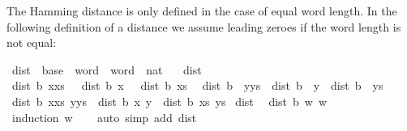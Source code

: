 \begin{isabellebody}
\begin{isamarkuptext}%
The Hamming distance is only defined in the case of equal word length.
In the following definition of a distance we assume leading zeroes
  if the word length is not equal:%
\end{isamarkuptext}\isamarkuptrue%
\isamarkupfalse%
\ dist\ {\isacharcolon}{\kern0pt}{\isacharcolon}{\kern0pt}\ {\isachardoublequoteopen}base\ {\isasymRightarrow}\ word\ {\isasymRightarrow}\ word\ {\isasymRightarrow}\ nat{\isachardoublequoteclose}\ \isanewline
\ \ {\isachardoublequoteopen}dist\ {\isacharunderscore}{\kern0pt}\ {\isacharbrackleft}{\kern0pt}{\isacharbrackright}{\kern0pt}\ {\isacharbrackleft}{\kern0pt}{\isacharbrackright}{\kern0pt}\ {\isacharequal}{\kern0pt}\ {}{\isachardoublequoteclose}\isanewline
{\isacharbar}{\kern0pt}\ {\isachardoublequoteopen}dist\ b\ {\isacharparenleft}{\kern0pt}x{\isacharhash}{\kern0pt}xs{\isacharparenright}{\kern0pt}\ {\isacharbrackleft}{\kern0pt}{\isacharbrackright}{\kern0pt}\ {\isacharequal}{\kern0pt}\ dist{}\ b\ x\ {}\ {\isacharplus}{\kern0pt}\ dist\ b\ xs\ {\isacharbrackleft}{\kern0pt}{\isacharbrackright}{\kern0pt}{\isachardoublequoteclose}\isanewline
{\isacharbar}{\kern0pt}\ {\isachardoublequoteopen}dist\ b\ {\isacharbrackleft}{\kern0pt}{\isacharbrackright}{\kern0pt}\ {\isacharparenleft}{\kern0pt}y{\isacharhash}{\kern0pt}ys{\isacharparenright}{\kern0pt}\ {\isacharequal}{\kern0pt}\ dist{}\ b\ {}\ y\ {\isacharplus}{\kern0pt}\ dist\ b\ {\isacharbrackleft}{\kern0pt}{\isacharbrackright}{\kern0pt}\ ys{\isachardoublequoteclose}\isanewline
{\isacharbar}{\kern0pt}\ {\isachardoublequoteopen}dist\ b\ {\isacharparenleft}{\kern0pt}x{\isacharhash}{\kern0pt}xs{\isacharparenright}{\kern0pt}\ {\isacharparenleft}{\kern0pt}y{\isacharhash}{\kern0pt}ys{\isacharparenright}{\kern0pt}\ {\isacharequal}{\kern0pt}\ dist{}\ b\ x\ y\ {\isacharplus}{\kern0pt}\ dist\ b\ xs\ ys{\isachardoublequoteclose}\isanewline
\isanewline
{}\isamarkupfalse%
\ dist{\isacharunderscore}{\kern0pt}{}{\isacharcolon}{\kern0pt}\isanewline
\ \ {\isachardoublequoteopen}dist\ b\ w\ w\ {\isacharequal}{\kern0pt}\ {}{\isachardoublequoteclose}\isanewline
%
\isadelimproof
\ \ %
\endisadelimproof
%
\isatagproof
{}\isamarkupfalse%
\ {\isacharparenleft}{\kern0pt}induction\ w{\isacharparenright}{\kern0pt}\isanewline
\ \ \isamarkupfalse%
\ {\isacharparenleft}{\kern0pt}auto\ simp\ add{\isacharcolon}{\kern0pt}\ dist{}{\isacharunderscore}{\kern0pt}{}{\isacharparenright}{\kern0pt}%

\end{isabellebody}
